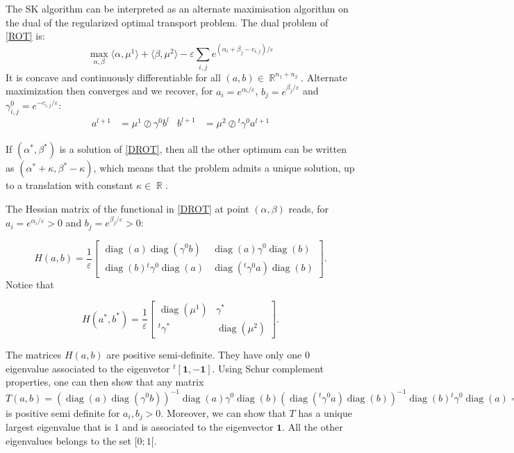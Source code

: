 \documentclass{article} %
\DeclareMathOperator{\IR}{\mathbb{R}}
\DeclareMathOperator{\diag}{diag}
\renewcommand{\epsilon}{\varepsilon}
\theoremstyle{plain}
\theoremstyle{definition}
\theoremstyle{remark}
\begin{document}
The SK algorithm can be interpreted as an alternate maximisation algorithm on the dual of the regularized optimal transport problem.
The dual problem of \eqref{ROT} is:
\begin{equation}\label{DROT}\max_{\alpha,\beta}\langle \alpha,\mu^1\rangle+\langle \beta,\mu^2\rangle-\epsilon\sum_{i,j}e^{(\alpha_i+\beta_j-c_{i,j})/\epsilon}\end{equation}
It is concave and continuously differentiable for all $(a,b)\in\IR^{n_1+n_2}$. Alternate maximization then converges and we recover, for $a_i=e^{\alpha_i/\epsilon}$, $b_j=e^{\beta_j/\epsilon}$ and $\gamma^0_{i,j}=e^{-c_{i,j}/\epsilon}$:
\begin{align*}
a^{l+1} &= {\mu^1}\oslash{\gamma^0 b^l} &
b^{l+1} &= {\mu^2}\oslash{^t \gamma^0 a^{l+1}} 
\end{align*}

If $(\alpha^*,\beta^*)$ is a solution of \eqref{DROT}, then all the 
other optimum can be written as $(\alpha^*+\kappa,\beta^*-\kappa)$, which means that the problem admits a unique solution, up to a translation with constant $\kappa\in\IR$.


The Hessian matrix of the functional in \eqref{DROT} at point $(\alpha,\beta)$ reads, for $a_i=e^{\alpha_i/\epsilon}>0$ and $b_j=e^{\beta_j/\epsilon}>0$:


$$H(a,b)=\frac1\epsilon\begin{bmatrix}
\diag(a)\diag(\gamma^0 b)&\diag(a)\gamma^0 \diag(b)\\
\diag(b){^t\gamma^0} \diag(a)&\diag(^t\gamma^0a)\diag(b)
\end{bmatrix}.$$
Notice that 

$$H(a^*,b^*)=\frac1\epsilon\begin{bmatrix}
\diag(\mu^1)&\gamma^*\\
^t\gamma^*&\diag(\mu^2)
\end{bmatrix}.$$


The matrices $H(a,b)$  are positive semi-definite. They have only one $0$ eigenvalue associated to the eigenvetor $^t[\mathbf{1},-\mathbf{1}]$. 
Using Schur complement properties, one can then show that any matrix $T(a,b)=(\diag(a)\diag(\gamma^0 b))^{-1}\diag(a)\gamma^0\diag(b)(\diag(^t\gamma^0a)\diag(b))^{-1} \diag(b){^t\gamma^0}\diag(a)=(\diag(\gamma^0 b))^{-1}\gamma^0(\diag(^t\gamma^0a))^{-1} \diag(b){^t\gamma^0}\diag(a)$ is positive semi definite for $a_i,b_j>0$. Moreover, we can show that $T$ has a unique largest eigenvalue that is $1$ and is associated to the eigenvector $\mathbf{1}$. All the other eigenvalues belongs to the set $[0;1[$.
\end{document}

